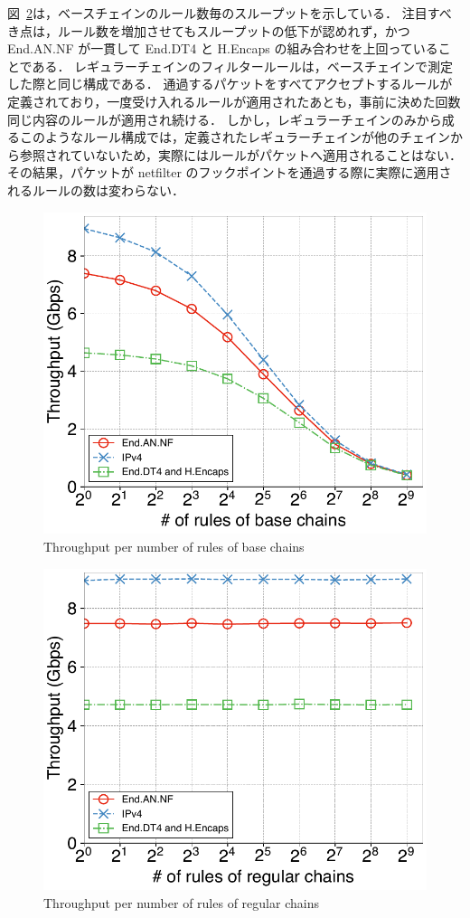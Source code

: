 図~\ref{fig:reg-thru}は，ベースチェインのルール数毎のスループットを示している．
注目すべき点は，ルール数を増加させてもスループットの低下が認めれず，かつ End.AN.NF が一貫して End.DT4 と H.Encaps の組み合わせを上回っていることである．
レギュラーチェインのフィルタールールは，ベースチェインで測定した際と同じ構成である．
通過するパケットをすべてアクセプトするルールが定義されており，一度受け入れるルールが適用されたあとも，事前に決めた回数同じ内容のルールが適用され続ける．
しかし，レギュラーチェインのみから成るこのようなルール構成では，定義されたレギュラーチェインが他のチェインから参照されていないため，実際にはルールがパケットへ適用されることはない．
その結果，パケットが netfilter のフックポイントを通過する際に実際に適用されるルールの数は変わらない．

\begin{figure}[t]
  \centering
  \includegraphics[width=0.95\linewidth]{img/rule-throughput.pdf}
  \caption{Throughput per number of rules of base chains}
  \label{fig:rule-thru}
\end{figure}

\begin{figure}[t]
  \centering
  \includegraphics[width=0.95\linewidth]{img/regular-throughput.pdf}
  \caption{Throughput per number of rules of regular chains}
  \label{fig:reg-thru}
\end{figure}

